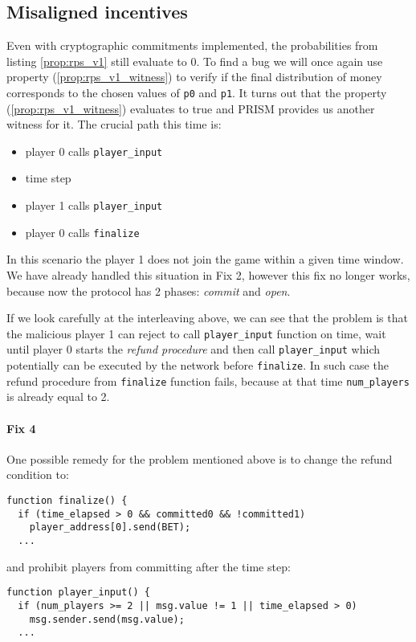 


\subsection{Misaligned incentives}

Even with cryptographic commitments implemented, the probabilities from listing \ref{prop:rps_v1} still evaluate to 0.
To find a bug we will once again use property (\ref{prop:rps_v1_witness}) to verify if the final distribution of money
corresponds to the chosen values of \lstinline{p0} and \lstinline{p1}.
It turns out that the property (\ref{prop:rps_v1_witness}) evaluates to true and PRISM provides us another witness 
for it. The crucial path this time is:
\begin{itemize}
\item player 0 calls \lstinline{player_input}
\item time step
\item player 1 calls \lstinline{player_input}
\item player 0 calls \lstinline{finalize}
\end{itemize}
In this scenario the player 1 does not join the game within a given time window.
We have already handled this situation in Fix 2, however this fix no longer works, because now the protocol
has 2 phases: \emph{commit} and \emph{open}.

If we look carefully at the interleaving above, we can see that the problem is
that the malicious player 1 can reject to call \lstinline{player_input} function on time, wait until player 0 starts
the \emph{refund procedure} and then call \lstinline{player_input} which potentially can be executed by the 
network before \lstinline{finalize}.
In such case the refund procedure from \lstinline{finalize} function fails, because at that time
\lstinline{num_players} is already equal to 2.

\paragraph{Fix 4}

One possible remedy for the problem mentioned above is to change the refund condition to:
\begin{lstlisting}
function finalize() {
  if (time_elapsed > 0 && committed0 && !committed1)
    player_address[0].send(BET);
  ...
\end{lstlisting}
and prohibit players from committing after the time step:
\begin{lstlisting}
function player_input() {
  if (num_players >= 2 || msg.value != 1 || time_elapsed > 0)
    msg.sender.send(msg.value);
  ...
\end{lstlisting}

